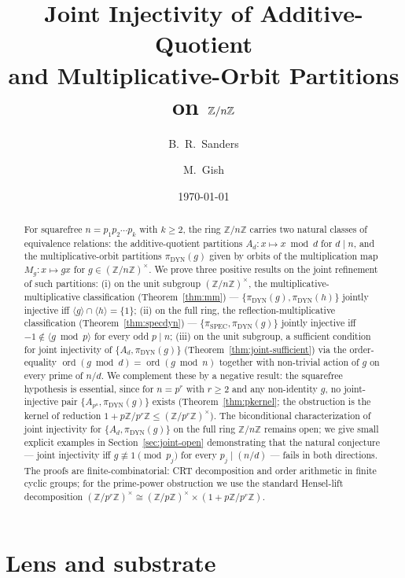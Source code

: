 \documentclass[11pt,reqno]{amsart}
\title[Joint injectivity of additive-quotient and multiplicative-orbit partitions]%
{Joint Injectivity of Additive-Quotient\\
 and Multiplicative-Orbit Partitions on $\Z/n\Z$}
\author{B.~R.~Sanders}
\author{M.~Gish}
\date{\today}
\theoremstyle{plain}
\theoremstyle{definition}
\theoremstyle{remark}
\DeclareMathOperator{\ord}{ord}
\DeclareMathOperator{\spec}{SPEC}
\DeclareMathOperator{\dyn}{DYN}
\newcommand{\Z}{\mathbb{Z}}
\begin{document}
\begin{abstract}
For squarefree $n = p_{1} p_{2} \cdots p_{k}$ with $k \ge 2$, the
ring $\Z/n\Z$ carries two natural classes of equivalence relations:
the additive-quotient partitions $A_{d} : x \mapsto x \bmod d$ for
$d \mid n$, and the multiplicative-orbit partitions
$\pi_{\dyn}(g)$ given by orbits of the multiplication map
$M_{g} : x \mapsto g x$ for $g \in (\Z/n\Z)^{\times}$. We prove
three positive results on the joint refinement of such partitions:
(i) on the unit subgroup $(\Z/n\Z)^{\times}$, the
multiplicative-multiplicative classification
(Theorem~\ref{thm:mm}) --- $\{\pi_{\dyn}(g), \pi_{\dyn}(h)\}$
jointly injective iff $\langle g \rangle \cap \langle h \rangle =
\{1\}$; (ii) on the full ring, the reflection-multiplicative
classification (Theorem~\ref{thm:specdyn}) --- $\{\pi_{\spec},
\pi_{\dyn}(g)\}$ jointly injective iff $-1 \notin \langle g \bmod
p \rangle$ for every odd $p \mid n$; (iii) on the unit subgroup, a
sufficient condition for joint injectivity of $\{A_{d},
\pi_{\dyn}(g)\}$ (Theorem~\ref{thm:joint-sufficient}) via the
order-equality $\ord(g \bmod d) = \ord(g \bmod n)$ together with
non-trivial action of $g$ on every prime of $n/d$. We complement
these by a negative result: the squarefree hypothesis is essential,
since for $n = p^{r}$ with $r \ge 2$ and any non-identity $g$, no
joint-injective pair $\{A_{p^{a}}, \pi_{\dyn}(g)\}$ exists
(Theorem~\ref{thm:pkernel}; the obstruction is the kernel of
reduction $1 + p\Z/p^{r}\Z \le (\Z/p^{r}\Z)^{\times}$). The
biconditional characterization of joint injectivity for $\{A_{d},
\pi_{\dyn}(g)\}$ on the full ring $\Z/n\Z$ remains open; we give
small explicit examples in Section~\ref{sec:joint-open} demonstrating
that the natural conjecture --- joint injectivity iff $g \not\equiv
1 \pmod{p_{j}}$ for every $p_{j} \mid (n/d)$ --- fails in both
directions. The proofs are finite-combinatorial: CRT decomposition
and order arithmetic in finite cyclic groups; for the prime-power
obstruction we use the standard Hensel-lift decomposition
$(\Z/p^{r}\Z)^{\times} \cong (\Z/p\Z)^{\times} \times (1 +
p\Z/p^{r}\Z)$.
\end{abstract}

\maketitle

\section*{Lens and substrate}\label{sec:lens}
\end{document}
